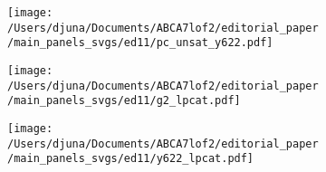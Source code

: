\documentclass[12pt]{article}
\begin{document}
\begin{figure}[H]
\begin{subfigure}[t]{.3\textwidth}
    \end{subfigure} 
    \begin{subfigure}[t]{.3\textwidth}
        \caption{}
        \texttt{[image: /Users/djuna/Documents/ABCA7lof2/editorial\_paper/main\_panels\_svgs/ed11/pc\_unsat\_y622.pdf]}        
    \end{subfigure} 
    \begin{subfigure}[t]{.2\textwidth}
        \caption{}
        \texttt{[image: /Users/djuna/Documents/ABCA7lof2/editorial\_paper/main\_panels\_svgs/ed11/g2\_lpcat.pdf]}        
    \end{subfigure} 
    \begin{subfigure}[t]{.2\textwidth}
        \caption{}
        \texttt{[image: /Users/djuna/Documents/ABCA7lof2/editorial\_paper/main\_panels\_svgs/ed11/y622\_lpcat.pdf]}        
    \end{subfigure} 
\end{figure}
\end{document}
